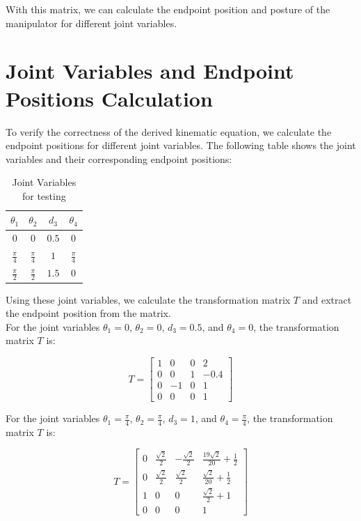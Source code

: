 \documentclass{article}
\begin{document}
With this matrix, we can calculate the endpoint position and posture of the manipulator for different joint variables.
\section*{Joint Variables and Endpoint Positions Calculation}

To verify the correctness of the derived kinematic equation, we calculate the endpoint positions for different joint variables. The following table shows the joint variables and their corresponding endpoint positions:

\begin{table}[h!]
  \centering
  \begin{tabular}{|c|c|c|c|}
  \hline
  $\theta_1$ & $\theta_2$ & $d_3$ & $\theta_4$ \\
  \hline
  $0$ & $0$ & $0.5$ & 0 \\
  $\frac{\pi}{4}$ & $\frac{\pi}{4}$ & $1$ & $\frac{\pi}{4}$\\
  $\frac{\pi}{2}$ & $\frac{\pi}{2}$ & $1.5$ & $0$\\
  \hline
  \end{tabular}
  \caption{Joint Variables for testing}
  \label{tab:joint_variables}
\end{table}

Using these joint variables, we calculate the transformation matrix
\( T \) and extract the endpoint position from the matrix.\\
For the joint variables \(\theta_1 = 0\), \(\theta_2 = 0\), \(d_3 = 0.5\), and \(\theta_4 = 0\),
the transformation matrix \( T \) is:

\[
T = \begin{bmatrix}
1 & 0 & 0 & 2 \\
0 & 0 & 1 & -0.4 \\
0 & -1 & 0 & 1 \\
0 & 0 & 0 & 1
\end{bmatrix}
\]

For the joint variables \(\theta_1 = \frac{\pi}{4}\), \(\theta_2 = \frac{\pi}{4}\), \(d_3 = 1\), and \(\theta_4 = \frac{\pi}{4}\),
the transformation matrix \( T \) is:

\[
T = \begin{bmatrix}
0 & \frac{\sqrt{2}}{2} & -\frac{\sqrt{2}}{2} & \frac{19\sqrt{2}}{20} + \frac{1}{2} \\
0 & \frac{\sqrt{2}}{2} & \frac{\sqrt{2}}{2} & \frac{\sqrt{2}}{20} + \frac{1}{2} \\
1 & 0 & 0 & \frac{\sqrt{2}}{2} + 1 \\
0 & 0 & 0 & 1
\end{bmatrix}
\]
\end{document}
